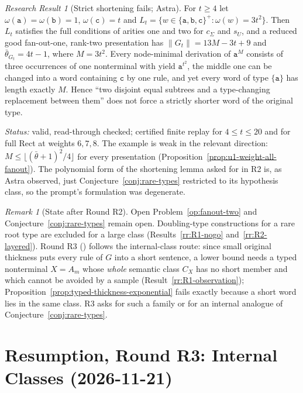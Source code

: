 \documentclass[11pt]{article}
\numberwithin{equation}{section}
\theoremstyle{plain}
\theoremstyle{definition}
\theoremstyle{remark}
\newtheorem{remark}[theorem]{Remark}
\newtheorem{rresult}[theorem]{Research Result}
\theoremstyle{plain}
\begin{document}
\begin{rresult}[Strict shortening fails; Astra]
\label{rr:R2-shortening}
For $t\ge4$ let $\omega(\mathtt a)=\omega(\mathtt b)=1$, $\omega(\mathtt c)=t$ and
$L_t=\{w\in\{\mathtt a,\mathtt b,\mathtt c\}^+:\omega(w)=3t^2\}$.  Then $L_t$ satisfies
the full conditions of arities one and two for $c_\Sigma$ and $s_U$, and a reduced good
fan-out-one, rank-two presentation has $\|G_t\|=13M-3t+9$ and $\bar\theta_{G_t}=4t-1$,
where $M=3t^2$.  Every node-minimal derivation of $\mathtt a^M$ consists of three
occurrences of one nonterminal with yield $\mathtt a^{t^2}$, the middle one can be
changed into a word containing $\mathtt c$ by one rule, and yet every word of type
$\{\mathtt a\}$ has length exactly $M$.  Hence ``two disjoint equal subtrees and a
type-changing replacement between them'' does not force a strictly shorter word of the
original type.
\end{rresult}
\noindent\emph{Status:} valid, read-through checked; certified finite replay for
$4\le t\le20$ and for full Rect at weights $6,7,8$.  The example is weak in the relevant
direction: $M\le\lfloor(\bar\theta+1)^2/4\rfloor$ for every presentation
(Proposition~\ref{prop:u1-weight-all-fanout}).  The polynomial form of the shortening
lemma asked for in R2 is, as Astra observed, just Conjecture~\ref{conj:rare-types}
restricted to its hypothesis class, so the prompt's formulation was degenerate.

\begin{remark}[State after Round R2]
\label{rem:R2-state}
Open Problem~\ref{op:fanout-two} and Conjecture~\ref{conj:rare-types} remain open.
Doubling-type constructions for a rare root type are excluded for a large class
(Results~\ref{rr:R1-nogo} and~\ref{rr:R2-layered}).  Round R3
() follows the internal-class route:
since small original thickness puts every rule of $G$ into a short sentence, a lower
bound needs a typed nonterminal $X=A_m$ whose \emph{whole} semantic class $C_X$ has no
short member and which cannot be avoided by a sample (Result~\ref{rr:R1-observation});
Proposition~\ref{prop:typed-thickness-exponential} fails exactly because a short word
lies in the same class.  R3 asks for such a family or for an internal analogue of
Conjecture~\ref{conj:rare-types}.
\end{remark}

\section{Resumption, Round R3: Internal Classes (2026-11-21)}
\label{sec:p4-resume-R3}
\end{document}
